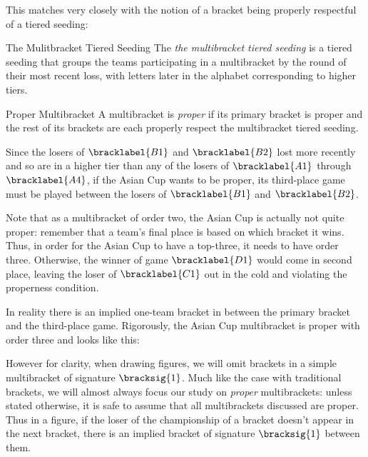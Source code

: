 {    This matches very closely with the notion of a bracket being properly respectful of a tiered seeding:

    \begin{definition}{The Mulitbracket Tiered Seeding}{}
        The \textit{the multibracket tiered seeding} is a tiered seeding that groups the teams participating in a multibracket by the round of their most recent loss, with letters later in the alphabet corresponding to higher tiers.
    \end{definition}

    \begin{definition}{Proper Multibracket}{}
        A multibracket is \textit{proper} if its primary bracket is proper and the rest of its brackets are each properly respect the multibracket tiered seeding.
    \end{definition}

    Since the losers of $\bracklabel{B1}$ and $\bracklabel{B2}$ lost more recently and so are in a higher tier than any of the losers of $\bracklabel{A1}$ through $\bracklabel{A4}$, if the Asian Cup wants to be proper, its third-place game must be played between the losers of $\bracklabel{B1}$ and $\bracklabel{B2}$.

    Note that as a multibracket of order two, the Asian Cup is actually not quite proper: remember that a team's final place is based on which bracket it wins. Thus, in order for the Asian Cup to have a top-three, it needs to have order three. Otherwise, the winner of game $\bracklabel{D1}$ would come in second place, leaving the loser of $\bracklabel{C1}$ out in the cold and violating the properness condition.

    In reality there is an implied one-team bracket in between the primary bracket and the third-place game. Rigorously, the Asian Cup multibracket is proper with order three and looks like this:


    However for clarity, when drawing figures, we will omit brackets in a simple multibracket of signature $\bracksig{1}$. Much like the case with traditional brackets, we will almost always focus our study on \textit{proper} multibrackets: unless stated otherwise, it is safe to assume that all multibrackets discussed are proper. Thus in a figure, if the loser of the championship of a bracket doesn't appear in the next bracket, there is an implied bracket of signature $\bracksig{1}$ between them.

}
